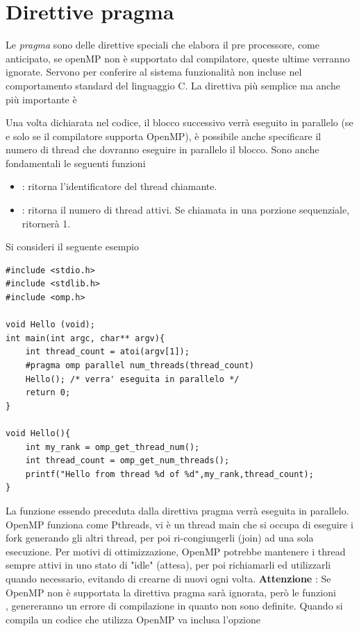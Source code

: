 \documentclass[10pt, letterpaper]{report}
\begin{document}
\section{Direttive pragma}
Le \textit{pragma} sono delle direttive speciali che elabora il pre processore, come anticipato, se openMP non è supportato dal compilatore, queste ultime verranno ignorate. Servono per conferire al sistema funzionalità non incluse nel comportamento standard del linguaggio C. \acc 
La direttiva più semplice ma anche più importante è\begin{quote}
\end{quote}
Una volta dichiarata nel codice, il blocco successivo verrà eseguito in parallelo (se e solo se il compilatore supporta OpenMP), è possibile anche specificare il numero di thread che dovranno eseguire in parallelo il blocco. Sono anche fondamentali le seguenti funzioni 
\begin{itemize}
    \item {} : ritorna l'identificatore del thread chiamante. 
    \item {} : ritorna il numero di thread attivi. Se chiamata in una porzione sequenziale, ritornerà 1.
\end{itemize}
Si consideri il seguente esempio
\begin{lstlisting}[style=CStyle]
#include <stdio.h>
#include <stdlib.h> 
#include <omp.h>

void Hello (void);
int main(int argc, char** argv){
    int thread_count = atoi(argv[1]);
    #pragma omp parallel num_threads(thread_count)
    Hello(); /* verra' eseguita in parallelo */
    return 0;
}

void Hello(){
    int my_rank = omp_get_thread_num();
    int thread_count = omp_get_num_threads();
    printf("Hello from thread %d of %d",my_rank,thread_count);
}
\end{lstlisting}
La funzione  essendo preceduta dalla direttiva pragma verrà eseguita in parallelo. OpenMP funziona come Pthreads, vi è un thread main che si occupa di eseguire i fork generando gli altri thread, per poi ri-congiungerli (join) ad una sola esecuzione. Per motivi di ottimizzazione, OpenMP potrebbe mantenere i thread sempre attivi in uno stato di "idle" (attesa), per poi richiamarli ed utilizzarli quando necessario, evitando di crearne di nuovi ogni volta.\acc 
\textbf{Attenzione} : Se OpenMP non è supportata la direttiva pragma sarà ignorata, però le funzioni \\,  genereranno un errore di compilazione in quanto non sono definite. Quando si compila un codice che utilizza OpenMP va inclusa l'opzione 
\end{document}
